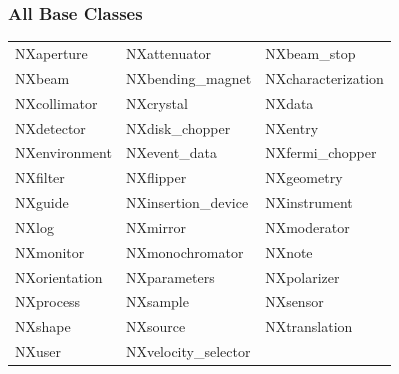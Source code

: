 \documentclass{beamer}
\begin{document}
\begin{frame}
\frametitle{All Base Classes}
\begin{tabular}{lll}
NXaperture & NXattenuator & NXbeam\_stop \\
NXbeam     & NXbending\_magnet & NXcharacterization \\
NXcollimator & NXcrystal & NXdata \\
NXdetector   & NXdisk\_chopper & NXentry \\
NXenvironment & NXevent\_data & NXfermi\_chopper \\
NXfilter & NXflipper & NXgeometry \\
NXguide & NXinsertion\_device & NXinstrument \\
NXlog & NXmirror & NXmoderator \\
NXmonitor & NXmonochromator & NXnote \\
NXorientation & NXparameters & NXpolarizer\\
NXprocess & NXsample & NXsensor \\
NXshape & NXsource & NXtranslation\\
NXuser & NXvelocity\_selector & \\
\end{tabular}
\end{frame}
\end{document}
